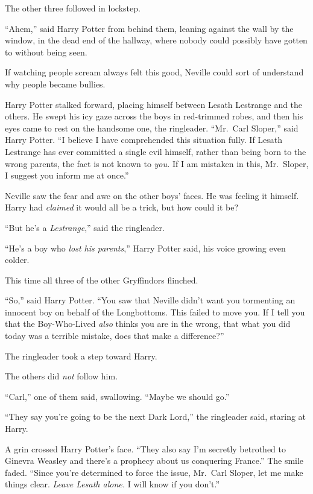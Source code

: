 The other three followed in lockstep.

``Ahem,'' said Harry Potter from behind them, leaning against the wall
by the window, in the dead end of the hallway, where nobody could
possibly have gotten to without being seen.

If watching people scream always felt this good, Neville could sort of
understand why people became bullies.

Harry Potter stalked forward, placing himself between Lesath Lestrange
and the others. He swept his icy gaze across the boys in red-trimmed
robes, and then his eyes came to rest on the handsome one, the
ringleader. ``Mr.~Carl Sloper,'' said Harry Potter. ``I believe I have
comprehended this situation fully. If Lesath Lestrange has ever
committed a single evil himself, rather than being born to the wrong
parents, the fact is not known to \emph{you.} If I am mistaken in this,
Mr.~Sloper, I suggest you inform me at once.''

Neville saw the fear and awe on the other boys' faces. He was feeling it
himself. Harry had \emph{claimed} it would all be a trick, but how could
it be?

``But he's a \emph{Lestrange},'' said the ringleader.

``He's a boy who \emph{lost his parents},'' Harry Potter said, his voice
growing even colder.

This time all three of the other Gryffindors flinched.

``So,'' said Harry Potter. ``You saw that Neville didn't want you
tormenting an innocent boy on behalf of the Longbottoms. This failed to
move you. If I tell you that the Boy-Who-Lived \emph{also} thinks you
are in the wrong, that what you did today was a terrible mistake, does
that make a difference?''

The ringleader took a step toward Harry.

The others did \emph{not} follow him.

``Carl,'' one of them said, swallowing. ``Maybe we should go.''

``They say you're going to be the next Dark Lord,'' the ringleader said,
staring at Harry.

A grin crossed Harry Potter's face. ``They also say I'm secretly
betrothed to Ginevra Weasley and there's a prophecy about us conquering
France.'' The smile faded. ``Since you're determined to force the issue,
Mr.~Carl Sloper, let me make things clear. \emph{Leave Lesath alone.} I
will know if you don't.''

